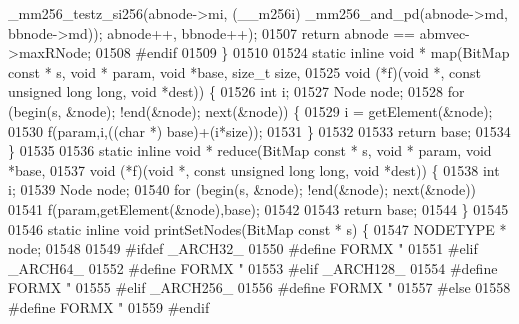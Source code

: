 \begin{DoxyCode}
{      \_mm256\_testz\_si256(abnode->mi, (\_\_m256i) \_mm256\_and\_pd(abnode->md, bbnode->md)); abnode++, bbnode++);
01507         \textcolor{keywordflow}{return} abnode == abmvec->maxRNode;
01508 \textcolor{preprocessor}{#endif}
01509 \}
01510 
01524 \textcolor{keyword}{static} \textcolor{keyword}{inline} \textcolor{keywordtype}{void} * map(BitMap \textcolor{keyword}{const} * s, \textcolor{keywordtype}{void} * param, \textcolor{keywordtype}{void} *base, \textcolor{keywordtype}{size\_t} size,
01525         \textcolor{keywordtype}{void} (*f)(\textcolor{keywordtype}{void} *, \textcolor{keyword}{const} \textcolor{keywordtype}{unsigned} \textcolor{keywordtype}{long} \textcolor{keywordtype}{long}, \textcolor{keywordtype}{void} *dest)) \{
01526         \textcolor{keywordtype}{int} i;
01527         Node node;
01528         \textcolor{keywordflow}{for} (begin(s, &node); !end(&node); next(&node)) \{
01529                 i = getElement(&node);
01530                 f(param,i,((\textcolor{keywordtype}{char} *) base)+(i*size));
01531         \}
01532 
01533         \textcolor{keywordflow}{return} base;
01534 \}
01535 
01536 \textcolor{keyword}{static} \textcolor{keyword}{inline} \textcolor{keywordtype}{void} * reduce(BitMap \textcolor{keyword}{const} * s, \textcolor{keywordtype}{void} * param, \textcolor{keywordtype}{void} *base,
01537         \textcolor{keywordtype}{void} (*f)(\textcolor{keywordtype}{void} *, \textcolor{keyword}{const} \textcolor{keywordtype}{unsigned} \textcolor{keywordtype}{long} \textcolor{keywordtype}{long}, \textcolor{keywordtype}{void} *dest)) \{
01538         \textcolor{keywordtype}{int} i;
01539         Node node;
01540         \textcolor{keywordflow}{for} (begin(s, &node); !end(&node); next(&node))
01541                 f(param,getElement(&node),base);
01542 
01543         \textcolor{keywordflow}{return} base;
01544 \}
01545 
01546 \textcolor{keyword}{static} \textcolor{keyword}{inline} \textcolor{keywordtype}{void} printSetNodes(BitMap \textcolor{keyword}{const} * s) \{
01547         NODETYPE * node;
01548 
01549 \textcolor{preprocessor}{#ifdef \_ARCH32\_}
01550 \textcolor{preprocessor}{#define FORMX " %
01551 \textcolor{preprocessor}{#elif \_ARCH64\_}
01552 \textcolor{preprocessor}{#define FORMX " %
01553 \textcolor{preprocessor}{#elif \_ARCH128\_}
01554 \textcolor{preprocessor}{#define FORMX " %
01555 \textcolor{preprocessor}{#elif \_ARCH256\_}
01556 \textcolor{preprocessor}{#define FORMX " %
01557 \textcolor{preprocessor}{#else}
01558 \textcolor{preprocessor}{#define FORMX " %
01559 \textcolor{preprocessor}{#endif}
}}}}}}
\end{DoxyCode}
